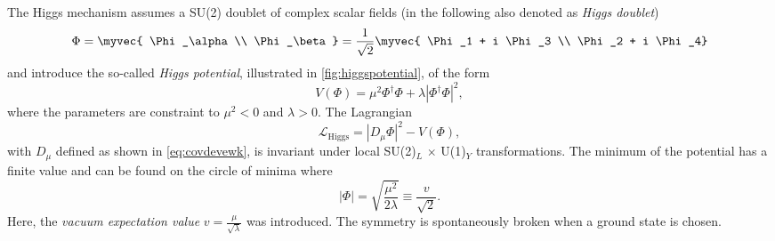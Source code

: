 
The Higgs mechanism assumes a SU(2) doublet of complex scalar fields (in the following also denoted as \emph{Higgs doublet})
\begin{equation}
  \Phi = \myvec{ \Phi_\alpha \\ \Phi_\beta } = \frac{1}{\sqrt{2}} \myvec { \Phi_1 + i \Phi_3 \\ \Phi_2 + i \Phi_4}
\end{equation}
and introduce the so-called \emph{Higgs potential}, illustrated in \cref{fig:higgspotential}, of the form
\begin{equation}
  V(\Phi) = \mu^2\Phi^\dagger\Phi + \lambda \left| \Phi^\dagger\Phi \right|^2,
  \label{eq:higgspotential}
\end{equation}
where the parameters are constraint to $\mu^2 < 0$ and $\lambda > 0$.
The Lagrangian 
\begin{equation}
  \mathcal{L}_{\text{Higgs}} = |D_\mu\Phi|^2 - V(\Phi), %
  \label{eq:lagrangianhiggs}
\end{equation}
with $D_\mu$ defined as shown in \cref{eq:covdevewk}, is invariant under local SU(2)$_L$ $\times$ U(1)$_Y$ transformations.
The minimum of the potential has a finite value and can be found on the circle of minima where
\begin{equation}
  |\Phi| = \sqrt{ \frac{\mu^2}{2\lambda} } \equiv \frac{ v }{\sqrt{2}}.
  \label{eq:higgsminima}
\end{equation}
Here, the \emph{vacuum expectation value} $v = \frac{\mu}{\sqrt{\lambda}}$ was introduced.
The symmetry is spontaneously broken when a ground state is chosen. 

